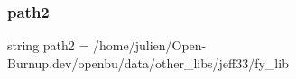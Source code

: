 \mbox{\label{namespacecompare__fy_a42264b85ba905eca731128fd2ac48c7b}} 
\subsubsection{\texorpdfstring{path2}{path2}}
{\footnotesize\ttfamily string path2 = \textquotesingle{}/home/julien/Open-\/Burnup.\+dev/openbu/data/other\+\_\+libs/jeff33/fy\+\_\+lib\textquotesingle{}}

